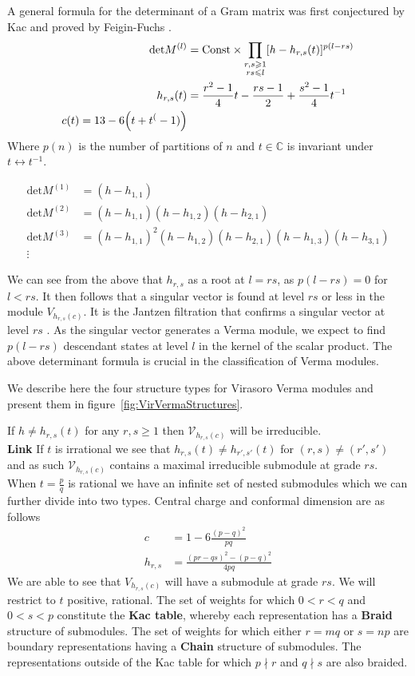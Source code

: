 \documentclass[a4paper,reqno,12pt]{report}
\theoremstyle{definition}
\newcommand{\C}{\mathbb{C}}
\numberwithin{equation}{section}
\let\originalleft\left     %
\let\originalright\right
\renewcommand{\left}{\mathopen{}\mathclose\bgroup\originalleft}
\renewcommand{\right}{\aftergroup\egroup\originalright}
\renewcommand{\ge}{\geqslant}
\renewcommand{\le}{\leqslant}
\theoremstyle{plain}
\begin{document}
A general formula for the determinant of a Gram matrix was first conjectured by Kac \cite{KacContForm79} and proved by Feigin-Fuchs \cite{FeiVerm83}. 
\begin{align*}
\text{det} M^{(l)} &= \text{Const} \times \prod_{\substack{r,s \ge 1 \\ rs\le l}} [h - h_{r,s} (t)]^{p(l-rs)}\\
h_{r,s}(t)  &= \frac{r^2 - 1}{4}t - \frac{rs-1}{2} + \frac{s^2-1}{4}t^{-1}\\
c(t) = 13 - 6\left(t+t^(-1)\right)
\end{align*}
Where $p(n)$ is the number of partitions of $n$ and $t\in \C$ is invariant under $t\leftrightarrow t^{-1}$. 

\begin{align*}
\text{det} M^{(1)} &=  (h-h_{1,1})\\
\text{det} M^{(2)} &=  (h-h_{1,1})(h-h_{1,2})(h-h_{2,1})\\
\text{det} M^{(3)} &=  (h-h_{1,1})^2(h-h_{1,2})(h-h_{2,1})(h-h_{1,3})(h-h_{3,1})\\
\vdots
\end{align*}

We can see from the above that $h_{r,s}$ as a root at $l=rs$, as $p(l-rs) = 0$ for $l<rs$. It then follows that a singular vector is found at level $rs$ or less in the module $V_{h_{r,s}(c)}$. It is the Jantzen filtration that confirms a singular vector at level $rs$ \cite{AstStr97}. As the singular vector generates a Verma module, we expect to find $p(l-rs)$ descendant states at level $l$ in the kernel of the scalar product. The above determinant formula is crucial in the classification of Verma modules.

We describe here the four structure types for Virasoro Verma modules and present them in figure~\ref{fig:VirVermaStructures}.

 If $h\neq h_{r,s}(t)$ for any $r,s \ge 1$ then $\mathcal{V}_{h_{r,s}(c)}$ will be irreducible.\\
{\bf Link} If $t$ is irrational we see that $h_{r,s}(t)\neq h_{r',s'}(t)$ for $(r,s)\neq (r',s')$ and as such $\mathcal{V}_{h_{r,s}(c)}$ contains a maximal irreducible submodule at grade $rs$.\\

When $t=\frac{p}{q}$ is rational we have an infinite set of nested submodules which we can further divide into two types. Central charge and conformal dimension are as follows
\begin{align*}
c &= 1-6\frac{(p-q)^2}{pq} \\
h_{r,s} &= \frac{(pr-qs)^2 - (p-q)^2}{4pq} 
\end{align*}
We are able to see that $V_{h_{r,s}(c)}$ will have a submodule at grade $rs$. We will restrict to $t$ positive, rational.   The set of weights for which $0<r<q$ and $0<s<p$ constitute the {\bf Kac table}, whereby each representation has a {\bf Braid} structure of submodules. The set of weights for which either $r=mq$ or $s=np$ are boundary representations having a {\bf Chain} structure of submodules. The representations outside of the Kac table for which $p \nmid r$ and $q \nmid s$ are also braided.
\end{document}
